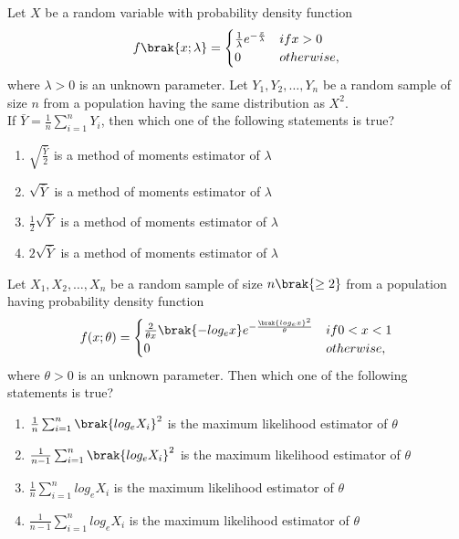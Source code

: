 \item Let $X$ be a random variable with probability density function
\begin{align*}
f\brak{x; \lambda} = \begin{cases} 
      \frac{1}{\lambda} e^{-\frac{x}{\lambda} }& if x > 0\\ 
      0 & otherwise, 
   \end{cases}
\end{align*}
where $\lambda > 0$ is an unknown parameter. Let $Y_1, Y_2, \ldots, Y_n$ be a random sample of size $n$ from a population having the same distribution as $X^2$.\\
If $\bar{Y} = \frac{1}{n} \sum_{i=1}^{n} Y_i$, then which one of the following statements is true?
\begin{enumerate}
    \item $\sqrt{\frac{\bar{Y}}{2}}$ is a method of moments estimator of $\lambda$
    \item $\sqrt{\bar{Y}}$ is a method of moments estimator of $\lambda$
    \item $\frac{1}{2} \sqrt{\bar{Y}}$ is a method of moments estimator of $\lambda$
    \item $2 \sqrt{\bar{Y}}$ is a method of moments estimator of $\lambda$
\end{enumerate}

\item Let $X_1, X_2, \ldots, X_n$ be a random sample of size $n \brak{\geq 2}$ from a population having probability density function
\begin{align*}
f(x; \theta) = \begin{cases} 
      \frac{2}{\theta x} \brak{-log_e x} e^{-\frac{\brak{log_e x}^2}{\theta}}  & if 0 < x < 1 \\ 
      0 & otherwise, 
   \end{cases}
\end{align*}
where $\theta > 0$ is an unknown parameter. Then which one of the following statements is true?

\begin{enumerate}
    \item $\frac{1}{n}\sum_{i=1}^n \brak{log_e X_i}^2$ is the maximum likelihood estimator of $\theta$
    \item $\frac{1}{n-1}\sum_{i=1}^n \brak{log_e X_i}^2$ is the maximum likelihood estimator of $\theta$
    \item $\frac{1}{n} \sum_{i=1}^n log_e X_i$ is the maximum likelihood estimator of $\theta$
    \item $\frac{1}{n-1} \sum_{i=1}^n log_e X_i$ is the maximum likelihood estimator of $\theta$
\end{enumerate}

